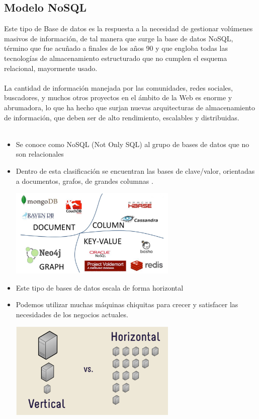 \documentclass[%
 reprint,
 amsmath,amssymb,
 aps,
]{revtex4-1}
\begin{document}
\subsection{Modelo NoSQL}
Este tipo de Base de datos es la respuesta a la necesidad de gestionar volúmenes masivos de información, de tal manera que surge la base de datos NoSQL, término que fue acuñado a finales de los años 90 y que engloba todas las tecnologías de almacenamiento estructurado que no cumplen el esquema relacional, mayormente usado.\\\\
La cantidad de información manejada por las comunidades, redes sociales, buscadores, y muchos otros proyectos en el ámbito de la Web es enorme y abrumadora, lo que ha hecho que surjan nuevas arquitecturas de almacenamiento de información, que deben ser de alto rendimiento, escalables y distribuidas.\\\\
	           \begin{itemize}
		\item Se conoce como NoSQL (Not Only SQL) al grupo de bases de datos que no son relacionales
                     \item Dentro de esta clasificación se encuentran las bases de clave/valor, orientadas a documentos, grafos, de grandes columnas .
                     \begin{center}
		\includegraphics[width=8cm]{./Imagenes/2}
		\end{center}	
		\item Este tipo de bases de datos escala de forma horizontal
		\item Podemos utilizar muchas máquinas chiquitas para crecer y satisfacer las necesidades de los negocios actuales.
                     \begin{center}
		\includegraphics[width=8cm]{./Imagenes/3}
		\end{center}	
	          \end{itemize}
\end{document}
